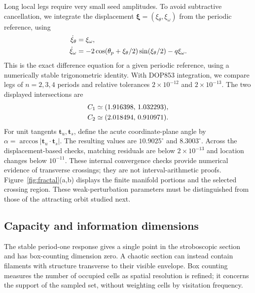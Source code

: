 \documentclass[aps,prb,reprint,floatfix]{revtex4-2}
\newcommand{\vect}[1]{\bm{#1}}
\begin{document}
Long local legs require very small seed amplitudes. To avoid subtractive cancellation, we integrate the displacement $\vect\xi=(\xi_\theta,\xi_\omega)$ from the periodic reference, using
\begin{align}
\dot\xi_\theta&=\xi_\omega,\notag\\
\dot\xi_\omega&=-2\cos(\theta_p+\xi_\theta/2)
\sin(\xi_\theta/2)-q\xi_\omega.
\label{eq:deviation_manifolds}
\end{align}
This is the exact difference equation for a given periodic reference, using a numerically stable trigonometric identity. With DOP853 integration, we compare legs of $n=2,3,4$ periods and relative tolerances $2\times10^{-12}$ and $2\times10^{-13}$. The two displayed intersections are
\begin{align}
C_1&\simeq(1.916398,\,1.032293),\notag\\
C_2&\simeq(2.018494,\,0.910971).
\label{eq:crossing_points}
\end{align}
For unit tangents $\vect t_u,\vect t_s$, define the acute coordinate-plane angle by $\alpha=\arccos|\vect t_u\cdot\vect t_s|$. The resulting values are $10.9025^\circ$ and $8.3003^\circ$. Across the displacement-based checks, matching residuals are below $2\times10^{-13}$ and location changes below $10^{-11}$. These internal convergence checks provide numerical evidence of transverse crossings; they are not interval-arithmetic proofs. Figure~\ref{fig:fractal}(a,b) displays the finite manifold portions and the selected crossing region. These weak-perturbation parameters must be distinguished from those of the attracting orbit studied next.

\subsection{Capacity and information dimensions}
\label{subsec:box_protocol}

The stable period-one response gives a single point in the stroboscopic section and has box-counting dimension zero. A chaotic section can instead contain filaments with structure transverse to their visible envelope. Box counting measures the number of occupied cells as spatial resolution is refined; it concerns the support of the sampled set, without weighting cells by visitation frequency.\cite{Falconer2014,HentschelProcaccia1983}
\end{document}
